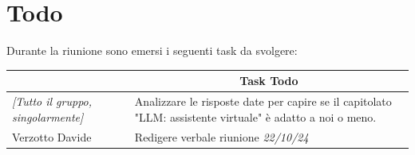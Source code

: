 \section{Todo}

Durante la riunione sono emersi i seguenti task da svolgere:

\vspace{0.5cm}

\begin{table}[htbp]
\begin{tabular}{|p{}|p{}|}
    \hline
    \rowcolor[gray]{0.9}
    \multicolumn{1}{|c|}{\textbf{Assegnatario}} & \multicolumn{1}{|c|}{\textbf{Task Todo}} \\
    \hline
    \emph{[Tutto il gruppo, singolarmente]} & Analizzare le risposte date per capire se il
capitolato "LLM: assistente virtuale" è adatto a noi o meno.  \\
    \hline
    Verzotto Davide & Redigere verbale riunione \emph{22/10/24} \\
    \hline
\end{tabular}
\end{table}

